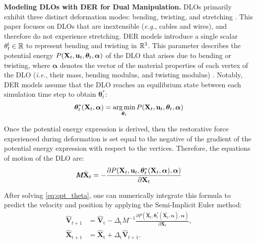 \textbf{Modeling DLOs with DER for Dual Manipulation.}
DLOs primarily exhibit three distinct deformation modes: bending, twisting, and stretching \cite{originalDER}. 
This paper focuses on DLOs that are inextensible (\textit{e.g.}, cables and wires), and therefore do not experience stretching.
DER models introduce a single scalar $\theta^\text{i}_{t} \in \mathbb{R}$ to represent bending and twisting in $\mathbb{R}^3$.  
This parameter describes the potential energy $P(\textbf{X}_t, \textbf{u}_t, \bm{\theta}_t,\bm{\alpha})$ of the DLO that arises due to bending or twisting, where $\bm{\alpha}$ denotes the vector of the material properties of each vertex of the DLO (\textit{i.e.}, their mass, bending modulus, and twisting modulus) \cite[Section 4.2]{originalDER}.
Notably, DER models assume that the DLO reaches an equilibrium state between each simulation time step to obtain $\bm{\theta}^*_t$:
\reducevspacebefore
\begin{equation}
  \bm{\theta}^*_t(\textbf{X}_t,\bm{\alpha}) = \operatorname*{arg\,min}_{\bm{\theta}_t} P(\textbf{X}_t, \textbf{u}_t, \bm{\theta}_t,\bm{\alpha})
       \label{eq:opt_theta}
\end{equation}
\reducevspaceafter

Once the potential energy expression is derived, then the restorative force experienced during deformation is set equal to the negative of the gradient of the potential energy expression with respect to the vertices. 
Therefore, the equations of motion of the DLO are:
\reducevspacebefore
\begin{equation}
       \textit{\textbf{M}}\ddot{\textbf{X}}_{t} = -\frac{\partial P(\textbf{X}_t, \textbf{u}_t, \bm{\theta}^*_t(\textbf{X}_t,\bm{\alpha}),\bm{\alpha})}{\partial  \textbf{X}_{t}}
       \label{eq:equation of motion}
\end{equation}
\reducevspaceafter

After solving \eqref{eq:opt_theta}, one can numerically integrate this formula to predict the velocity and position by applying the Semi-Implicit Euler method:
\reducevspacebefore
\begin{align}
        \hat{\textbf{V}}_{t+1} &= \hat{\textbf{V}}_\text{t}-\Delta_\text{t}M^{-1}\frac{\partial P(\hat{\textbf{X}}_t, \bm{\theta}^*_t(\hat{\textbf{X}}_t,\bm{\alpha}),\bm{\alpha})}{\partial \textbf{X}_{t}}, \label{eq:Semi-Euler1}\\  
        \hat{\textbf{X}}_{\text{t}+1} &= \hat{\textbf{X}}_\text{t} + \Delta_\text{t}\hat{\textbf{V}}_{t+1}.
       \label{eq:Semi-Euler2}
\end{align}
\reducevspaceafter

